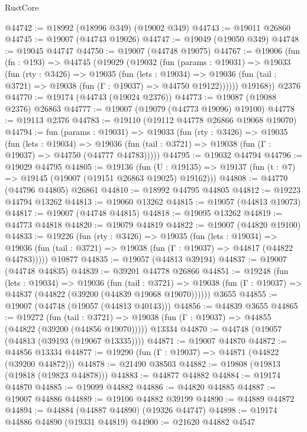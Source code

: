 \begin{lexlean}{RustCore}
\begin{coremodule}
@44742 := @18992 (@18996 @349) (@19002 @349)
@44743 := @19011 @26860
@44745 := @19007 (@44743 @19026)
@44747 := @19049 (@19050 @349)
@44748 := @19045 @44747
@44750 := @19007 (@44748 @19075)
@44767 := @19006
    (fun (fn : @193) =>
    @44745
      (@19029
        (@19032
          (fun (params : @19031) =>
          @19033
            (fun (rty : @3426) =>
            @19035
              (fun (lets : @19034) =>
              @19036 (fun (tail : @3721) => @19038 (fun (Γ : @19037) => @44750 @19122))))))
        @19168))
    @2376
@44770 := @19174 (@44743 (@19024 @2376))
@44773 := @19087 (@19088 @2376) @26863
@44777 := @19007 (@19079 (@44773 @19096) @19100)
@44778 := @19113 @2376
@44783 := @19110 (@19112 @44778 @26866 @19068 @19070)
@44794 := fun (params : @19031) =>
  @19033
    (fun (rty : @3426) =>
    @19035
      (fun (lets : @19034) =>
      @19036 (fun (tail : @3721) => @19038 (fun (Γ : @19037) => @44750 (@44777 @44783)))))
@44795 := @19032 @44794
@44796 := @19029 @44795
@44805 := @19136
    (fun (U : @19135) => @19137 (fun (t : @7) => @19145 (@19007 (@19151 @26863 @19025) @19162)))
@44808 := @44770 (@44796 @44805) @26861
@44810 := @18992 @44795 @44805
@44812 := @19223 @44794 @13262
@44813 := @19060 @13262
@44815 := @19057 (@44813 @19073)
@44817 := @19007 (@44748 @44815)
@44818 := @19095 @13262
@44819 := @44773 @44818
@44820 := @19079 @44819
@44822 := @19007 (@44820 @19100)
@44833 := @19226
    (fun (rty : @3426) =>
    @19035
      (fun (lets : @19034) =>
      @19036 (fun (tail : @3721) => @19038 (fun (Γ : @19037) => @44817 (@44822 @44783)))))
    @10877
@44835 := @19057 (@44813 @39194)
@44837 := @19007 (@44748 @44835)
@44839 := @39201 @44778 @26866
@44851 := @19248
    (fun (lets : @19034) =>
    @19036
      (fun (tail : @3721) =>
      @19038 (fun (Γ : @19037) => @44837 (@44822 (@39200 (@44839 @19068 @19070))))))
    @3655
@44855 := @19007 (@44748 (@19057 (@44813 @40143)))
@44856 := @44839 @3655
@44865 := @19272
    (fun (tail : @3721) => @19038 (fun (Γ : @19037) => @44855 (@44822 (@39200 (@44856 @19070)))))
    @13334
@44870 := @44748 (@19057 (@44813 (@39193 (@19067 @13335))))
@44871 := @19007 @44870
@44872 := @44856 @13334
@44877 := @19290 (fun (Γ : @19037) => @44871 (@44822 (@39200 @44872)))
@44878 := @21490 @38503
@44882 := @19808 (@19813 (@19818 (@19823 @44878)))
@44883 := @44877 @44882
@44884 := @19174 @44870
@44885 := @19099 @44882
@44886 := @44820 @44885
@44887 := @19007 @44886
@44889 := @19106 @44882 @39199
@44890 := @44889 @44872
@44894 := @44884 (@44887 @44890) (@19326 @44747)
@44898 := @19174 @44886 @44890 (@19331 @44819)
@44900 := @21620 @44882 @4547

\end{coremodule}
\end{lexlean}
